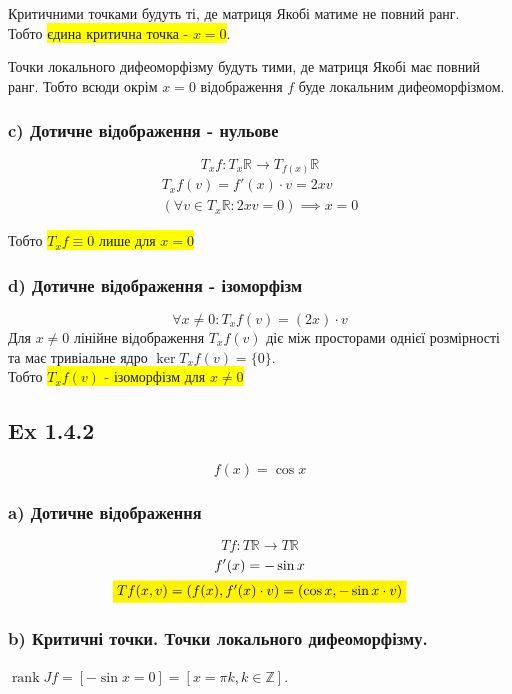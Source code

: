 \documentclass[10pt, a4paper]{article} %
\newcommand{\R}{\mathbb{R}}
\DeclareMathOperator{\rank}{rank}
\begin{document}
Критичними точками будуть ті, де матриця Якобі матиме не повний ранг.\\
Тобто \colorbox{yellow}{єдина критична точка - $x=0$}.

Точки локального дифеоморфізму будуть тими, де матриця Якобі має повний ранг.
Тобто всюди окрім $x=0$ відображення $f$ буде локальним дифеоморфізмом.

\subsubsection*{c) Дотичне відображення - нульове}
\[T_{x}f : T_{x}\R \to T_{f(x)}\R\]
\begin{gather*}
    T_{x}f(v) = f'(x) \cdot v = 2xv\\
    \left(\forall v\in T_{x}\R: 2xv = 0\right) \implies  x = 0
\end{gather*}

Тобто \colorbox{yellow}{$T_{x}f \equiv 0$ лише для $x=0$}

\subsubsection*{d) Дотичне відображення - ізоморфізм}

\[\forall x\ne 0: T_{x}f(v) = (2x)\cdot v\]
Для $x\ne 0$ лінійне відображення $T_{x}f(v)$ діє між просторами однієї розмірності та має тривіальне ядро $\ker T_{x}f(v) = \{0\}$. \\
Тобто \colorbox{yellow}{$T_{x}f(v)$ - ізоморфізм для $x\ne 0$}

\subsection*{Ex 1.4.2}
\begin{mdframed}
    \[f(x) = \cos x\]
\end{mdframed}

\subsubsection*{a) Дотичне відображення}
\[Tf : T\R \to T\R\]
\begin{gather*}
    f'(x) = -\sin x\\
    \colorbox{yellow}{$Tf(x,v) = (f(x), f'(x)\cdot v) = (\cos x, -\sin x \cdot v)$}
\end{gather*}

\subsubsection*{b) Критичні точки. Точки локального дифеоморфізму.}
$\rank Jf = [-\sin x = 0] = [x = \pi k, k\in\mathbb Z]$.
\end{document}
